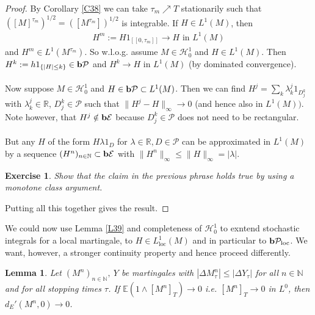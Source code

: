 \documentclass[12pt,a4paper, twoside]{article}
\newtheorem{lem}{Lemma}[section]
\newtheorem{exe}{Exercise}[section]
\theoremstyle{definition}
\newcommand{\EE}{\mathbb{E}} %
\newcommand{\simple}{\textbf{\text{b}}\mathcal{E}}
\newcommand{\pred}{\textbf{\text{b}}\mathcal{P}}
\begin{document}
\begin{proof}
By Corollary \ref{C38} we can take $\tau_m \nearrow T$ stationarily such that $( [M]^{\tau_m})^{1/2} = ([M^{\tau_m}])^{1/2}$ is integrable. If $H \in L^1(M)$, then 
\begin{align*}
H^m:= H1_{ [\![ 0, \tau_m]\!]} \to H \text{ in } L^1(M)
\end{align*}
and $H^m \in L^1( M^{\tau_m}).$ So w.l.o.g. assume $M \in \mathcal{H}_0^1$ and $H \in L^1(M)$. Then $H^k := h 1_{\{ |H| \leq k \}} \in \pred$ and $H^k \to H$ in $L^1(M)$ (by dominated convergence). \\
\\
Now suppose $M \in \mathcal{H}_0^1$ and $H \in \pred \subset L^1(M)$. Then we can find $H^j = \sum_k \lambda_k^j 1_{D_j^k}$ with $\lambda_k^j \in \mathbb{R}$, $D_j^k \in \mathcal{P}$ such that $\|H^j-H\|_\infty \to 0$ (and hence also in $L^1(M))$. Note however, that $H^j \notin \simple$ because $D_j^k \in \mathcal{P}$ does not need to be rectangular. \\
\\
But any $H$ of the form $H \lambda 1_D$ for $\lambda \in \mathbb{R}, D \in \mathcal{P}$ can be approximated in $L^1(M)$ by a sequence $(H^n)_{n \in \mathbb{N}} \subset \simple$ with $\|H^n\|_\infty \leq \|H\|_\infty = | \lambda|$. 
\begin{exe} Show that the claim in the previous phrase holds true by using a monotone class argument. 
\end{exe}
\noindent Putting all this together gives the result. 
\end{proof}
\newpage
We could now use Lemma \ref{L39} and completeness of $\mathcal{H}_0^1$ to exntend stochastic integrals for a local martingale, to $H \in L_\text{loc}^1(M)$ and in particular to $\pred_\text{loc}$. We want, however, a stronger continuity property and hence proceed differently. 
\begin{lem} \label{L310} Let $(M^n)_{n \in \mathbb{N}}, \ Y$ be martingales with $| \Delta M_\tau^n | \leq | \Delta Y_\tau |$ for all $n \in \mathbb{N}$ and for all stopping times $\tau$. If $\EE(1 \wedge [M^n]_T) \to 0$ i.e. $[M^n]_T \to 0$ in $L^0$, then $d_E' ( M^n,0 ) \to 0$. 
\end{lem}
\end{document}
